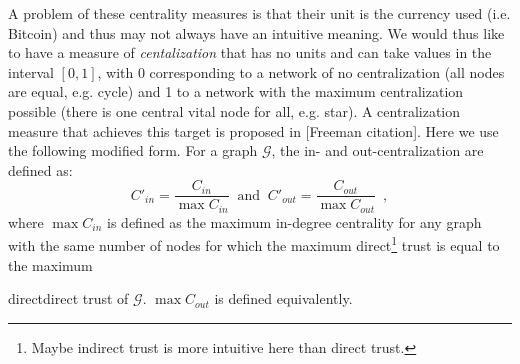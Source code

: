     A problem of these centrality measures is that their unit is the currency used (i.e. Bitcoin) and thus may not always have
    an intuitive meaning. We would thus like to have a measure of \textit{centalization} that has no units and can take values
    in the interval $\left[0,1\right]$, with 0 corresponding to a network of no centralization (all nodes are equal, e.g.
    cycle) and 1 to a network with the maximum centralization possible (there is one central vital node for all, e.g. star). A
    centralization measure that achieves this target is proposed in [Freeman citation]. Here we use the following modified
    form. For a graph $\mathcal{G}$, the in- and out-centralization are defined as:
    \begin{equation*}
      C'_{in} = \frac{C_{in}}{\max C_{in}} \: \mbox{ and } \: C'_{out} = \frac{C_{out}}{\max C_{out}} \enspace,
    \end{equation*}
    where $\max C_{in}$ is defined as the maximum in-degree centrality for any graph with the same number of nodes for which
    the maximum direct\footnote{Maybe indirect trust is more intuitive here than direct trust.} trust is equal to the maximum
    \addtocounter{footnote}{-1} direct\footnotemark direct trust of $\mathcal{G}$. $\max C_{out}$ is defined equivalently.

    \noindent\hrulefill
    \newpage
